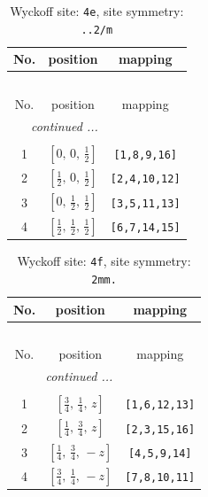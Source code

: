 \documentclass[fleqn,8pt]{jsarticle}
\begin{document}
\begin{longtable}{ccc}
\caption{Wyckoff site: {\tt 4e}, site symmetry: {\tt ..2/m}}
 \\
 \hline \hline
No. & position & mapping \\ \hline \endfirsthead

\multicolumn{2}{l}{\tablename\ \thetable{}} \\
 \hline \hline
No. & position & mapping \\ \hline \endhead

 \hline \hline
\multicolumn{2}{r}{\footnotesize\it continued ...} \\ \endfoot

 \hline \hline
\multicolumn{2}{r}{} \\ \endlastfoot

1 & $\left[ 0,\, 0,\, \frac{1}{2} \right]$ & {\tt [1,8,9,16]} \\ \hline
2 & $\left[ \frac{1}{2},\, 0,\, \frac{1}{2} \right]$ & {\tt [2,4,10,12]} \\ \hline
3 & $\left[ 0,\, \frac{1}{2},\, \frac{1}{2} \right]$ & {\tt [3,5,11,13]} \\ \hline
4 & $\left[ \frac{1}{2},\, \frac{1}{2},\, \frac{1}{2} \right]$ & {\tt [6,7,14,15]} \\
\end{longtable}
\renewcommand{\arraystretch}{1.2}
\begin{longtable}{ccc}
\caption{Wyckoff site: {\tt 4f}, site symmetry: {\tt 2mm.}}
 \\
 \hline \hline
No. & position & mapping \\ \hline \endfirsthead

\multicolumn{2}{l}{\tablename\ \thetable{}} \\
 \hline \hline
No. & position & mapping \\ \hline \endhead

 \hline \hline
\multicolumn{2}{r}{\footnotesize\it continued ...} \\ \endfoot

 \hline \hline
\multicolumn{2}{r}{} \\ \endlastfoot

1 & $\left[ \frac{3}{4},\, \frac{1}{4},\, z \right]$ & {\tt [1,6,12,13]} \\ \hline
2 & $\left[ \frac{1}{4},\, \frac{3}{4},\, z \right]$ & {\tt [2,3,15,16]} \\ \hline
3 & $\left[ \frac{1}{4},\, \frac{3}{4},\, - z \right]$ & {\tt [4,5,9,14]} \\ \hline
4 & $\left[ \frac{3}{4},\, \frac{1}{4},\, - z \right]$ & {\tt [7,8,10,11]} \\
\end{longtable}
\end{document}

